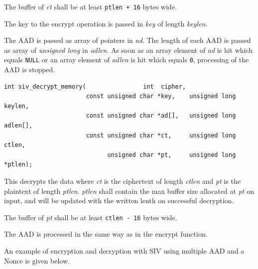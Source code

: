 \documentclass[synpaper]{book}
\begin{document}
The buffer of \textit{ct} shall be at least \texttt{ptlen + 16} bytes wide.

The key to the encrypt operation is passed in \textit{key} of length  \textit{keylen}.

The AAD is passed as array of pointers in \textit{ad}. The length of each AAD is passed as array of
\textit{unsigned long} in \textit{adlen}.
As soon as an array element of \textit{ad} is hit which equals \texttt{NULL} or an array element of \textit{adlen}
is hit which equals \texttt{0}, processing of the AAD is stopped.

\begin{verbatim}
int siv_decrypt_memory(                int  cipher,
                       const unsigned char *key,    unsigned long  keylen,
                       const unsigned char *ad[],   unsigned long  adlen[],
                       const unsigned char *ct,     unsigned long  ctlen,
                             unsigned char *pt,     unsigned long *ptlen);
\end{verbatim}
This decrypts the data where \textit{ct} is the ciphertext of length \textit{ctlen} and \textit{pt} is the plaintext of length \textit{ptlen}.
\textit{ptlen} shall contain the max buffer size allocated at \textit{pt} on input, and will be updated with the
written lenth on successful decryption.

The buffer of \textit{pt} shall be at least \texttt{ctlen - 16} bytes wide.

The AAD is processed in the same way as in the encrypt function.

An example of encryption and decryption with SIV using multiple AAD and a Nonce is given below.
\end{document}
